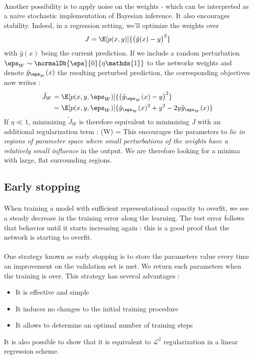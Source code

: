 \documentclass[a4paper]{article}
\begin{document}
{{			\paragraph{} Another possibility is to apply noise on the weights - which can be interpreted as a naive stochastic implementation of Bayesian inference. It also encourages stability. Indeed, in a regression setting, we'll optimize the weights over 
			\begin{equation}
				J = \E[p(x,y)]{\big(\hat{y}(x) - y\big)^2}
			\end{equation}
			with $\hat{y}(x)$ being the current prediction. If we include a random perturbation $\eps_W \sim \normalDb{\eps}{0}{\eta \mathds{1}}$ to the networks weights and denote $\hat{y}_{\eps_W}(x)$ the resulting perturbed prediction, the corresponding objectives now writes : 
			\begin{equation}
				\begin{aligned}
					\tilde{J}_W &= \E[p(x,y,\eps_W)]{\big(\hat{y}_{\eps_W}(x) - y \big)^2} \\
							 &= \E[p(x,y,\eps_W)]{\hat{y}_{\eps_W}(x)^2 + y^2 - 2y\hat{y}_{\eps_W}(x)}
				\end{aligned}
			\end{equation}
			If $\eta \ll 1$, minimizing $\tilde{J}_W$ is therefore equivalent to minimizing $J$ with an additional regularization term : 
			{
				\Omega(W) = \eta {}
			}
			This encourages the parameters to \emph{lie in regions of parameter space where small perturbations of the weights have a relatively small influence} in the output. We are therefore looking for a minima with large, flat surrounding regions. 
		}
		\subsection{Early stopping}
		{
			\paragraph{} When training a model with sufficient representational capacity to overfit, we see a steady decrease in the training error along the learning. The test error follows that behavior until it starts increasing again : this is a good proof that the network is starting to overfit. 
			
			\paragraph{} One strategy known as early stopping is to store the parameters value every time an improvement on the validation set is met. We return such parameters when the training is over. This strategy has several advantages : 
			\begin{itemize}
				\item It is effective and simple 
				\item It induces no changes to the initial training procedure
				\item It allows to determine an optimal number of training steps 
			\end{itemize}
			It is also possible to show that it is equivalent to $\mathcal{L}^2$ regularization in a linear regression scheme. 
		}
}
\end{document}
